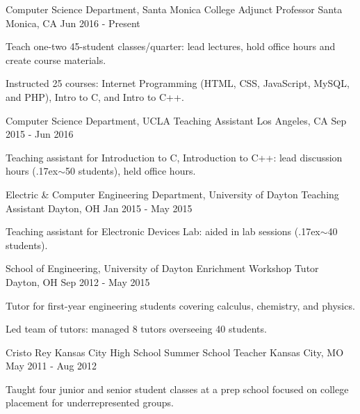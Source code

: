 


\begin{cventries}

\cventry
{Computer Science Department, Santa Monica College}
{Adjunct Professor}
{Santa Monica, CA}
{Jun 2016 - Present}
{
\begin{cvitems}
  \item Teach one-two 45-student classes/quarter: lead lectures, hold office hours and create course materials.
  \item Instructed 25 courses: Internet Programming (HTML, CSS, JavaScript, MySQL, and PHP), Intro to C, and Intro to C++.
\end{cvitems}
}


\cventry
{Computer Science Department, UCLA}
{Teaching Assistant}
{Los Angeles, CA}
{Sep 2015 - Jun 2016}
{
\begin{cvitems}
  \item Teaching assistant for Introduction to C, Introduction to C++: lead discussion hours ({\raise.17ex\hbox{$\scriptstyle\sim$}}50 students), held office hours.
\end{cvitems}
}

\cventry
{Electric \& Computer Engineering Department, University of Dayton}
{Teaching Assistant}
{Dayton, OH}
{Jan 2015 - May 2015}
{
\begin{cvitems}
  \item Teaching assistant for Electronic Devices Lab: aided in lab sessions ({\raise.17ex\hbox{$\scriptstyle\sim$}}40 students).
\end{cvitems}
}

\cventry
{School of Engineering, University of Dayton}
{Enrichment Workshop Tutor}
{Dayton, OH}
{Sep 2012 - May 2015}
{
\begin{cvitems}
  \item Tutor for first-year engineering students covering calculus, chemistry, and physics.
  \item Led team of tutors: managed 8 tutors overseeing 40 students.
\end{cvitems}
}


\cventry
{Cristo Rey Kansas City High School}
{Summer School Teacher}
{Kansas City, MO}
{May 2011 - Aug 2012}
{
\begin{cvitems}
\item Taught four junior and senior student classes at a prep school focused on college placement for underrepresented groups.
\end{cvitems}
}

\end{cventries}